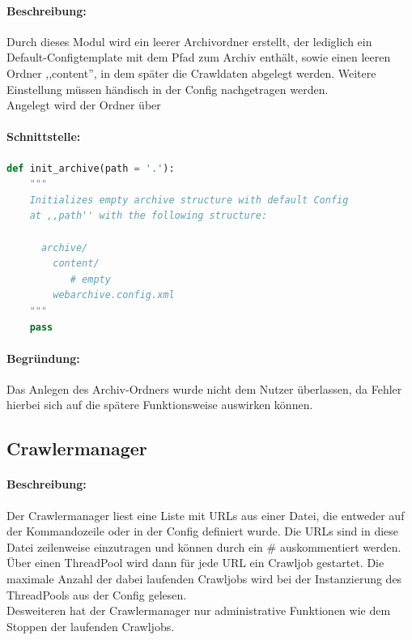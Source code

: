 \paragraph{Beschreibung:}
\label{par:beschreibung}
Durch dieses Modul wird ein leerer Archivordner erstellt, der lediglich
ein Default-Configtemplate mit dem Pfad zum Archiv enthält, sowie einen leeren Ordner ,,content'',
in dem später die Crawldaten abgelegt werden.
Weitere Einstellung müssen händisch in der Config nachgetragen werden.
\\
Angelegt wird der Ordner über %
\paragraph{Schnittstelle:}
\label{par:schnittstelle}
\begin{lstlisting}[language=python]
def init_archive(path = '.'):
    """
    Initializes empty archive structure with default Config
    at ,,path'' with the following structure:

      archive/
        content/ 
           # empty
        webarchive.config.xml
    """
    pass
\end{lstlisting}

\paragraph{Begründung:}
\label{par:begr_ndung_}
Das Anlegen des Archiv-Ordners wurde nicht dem Nutzer überlassen, da
Fehler hierbei sich auf die spätere Funktionsweise auswirken können.


\subsection{Crawlermanager}
\label{sub:crawlermanager}
\paragraph{Beschreibung:}
\label{par:beschreibung_}
Der Crawlermanager liest eine Liste mit URLs aus einer Datei, die entweder auf der Kommandozeile oder in
der Config definiert wurde. Die URLs sind in diese Datei zeilenweise einzutragen und können durch ein \# auskommentiert werden.
Über einen ThreadPool wird dann für jede URL ein Crawljob gestartet. Die maximale Anzahl der dabei laufenden Crawljobs wird bei
der Instanzierung des ThreadPools aus der Config gelesen.
\\
Desweiteren hat der Crawlermanager nur administrative Funktionen wie dem Stoppen der laufenden Crawljobs.
